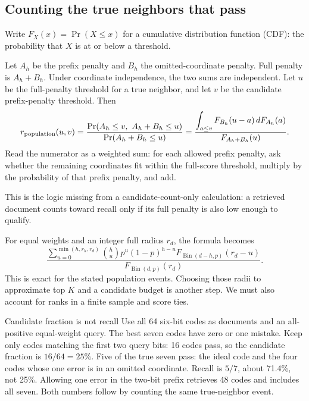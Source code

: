 \subsection{Counting the true neighbors that pass}
Write $F_X(x)=\Pr(X\leq x)$ for a cumulative distribution function (CDF): the probability that $X$ is at or below a threshold.

Let $A_h$ be the prefix penalty and $B_h$ the omitted-coordinate penalty. Full penalty is
$A_h+B_h$. Under coordinate independence, the two sums are independent. Let $u$ be the
full-penalty threshold for a true neighbor, and let $v$ be the candidate prefix-penalty threshold. Then
\begin{equation}
r_{\rm population}(u,v)=
\frac{\Pr(A_h\leq v,\ A_h+B_h\leq u)}{\Pr(A_h+B_h\leq u)}
=\frac{\displaystyle\int_{a\leq v}F_{B_h}(u-a)\,dF_{A_h}(a)}
 {F_{A_h+B_h}(u)}.
\label{eq:population-recall}
\end{equation}
Read the numerator as a weighted sum: for each allowed prefix penalty, ask whether the remaining coordinates fit within the full-score threshold, multiply by the probability of that prefix penalty, and add.

This is the logic missing from a candidate-count-only calculation: a retrieved document counts
toward recall only if its full penalty is also low enough to qualify.

For equal weights and an integer full radius $r_d$, the formula becomes
\begin{equation}
\frac{\displaystyle\sum_{u=0}^{\min(h,r_h,r_d)}
 \binom{h}{u}p^u(1-p)^{h-u}
 F_{\operatorname{Bin}(d-h,p)}(r_d-u)}
 {F_{\operatorname{Bin}(d,p)}(r_d)}.
\label{eq:binomial-recall}
\end{equation}
This is exact for the stated population events. Choosing those radii to approximate top $K$
and a candidate budget is another step. We must also account for ranks in a finite sample and score ties.

\begin{examplebox}{Candidate fraction is not recall}
Use all 64 six-bit codes as documents and an all-positive equal-weight query. The best seven
codes have zero or one mistake. Keep only codes matching the first two query bits: 16 codes
pass, so the candidate fraction is $16/64=25\%$. Five of the true seven pass: the ideal code
and the four codes whose one error is in an omitted coordinate. Recall is $5/7$, about 71.4\%,
not 25\%. Allowing one error in the two-bit prefix retrieves 48 codes and includes all seven.
Both numbers follow by counting the same true-neighbor event.
\end{examplebox}

